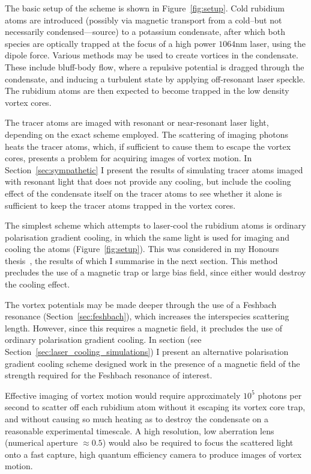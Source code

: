 The basic setup of the scheme is shown in Figure~\ref{fig:setup}. Cold rubidium atoms are introduced (possibly via magnetic transport from a cold--but not necessarily condensed---source) to a potassium condensate, after which both species are optically trapped at the focus of a high power $1064$nm laser, using the dipole force. Various methods may be used to create vortices in the condensate. These include bluff-body flow, where a repulsive potential is dragged through the condensate, and inducing a turbulent state by applying off-resonant laser speckle. The rubidium atoms are then expected to become trapped in the low density vortex cores.

The tracer atoms are imaged with resonant or near-resonant laser light, depending on the exact scheme employed. The scattering of imaging photons heats the tracer atoms, which, if sufficient to cause them to escape the vortex cores, presents a problem for acquiring images of vortex motion. In Section~\ref{sec:sympathetic} I present the results of simulating tracer atoms imaged with resonant light that does not provide any cooling, but include the cooling effect of the condensate itself on the tracer atoms to see whether it alone is sufficient to keep the tracer atoms trapped in the vortex cores.

The simplest scheme which attempts to laser-cool the rubidium atoms is ordinary polarisation gradient cooling, in which the same light is used for imaging and cooling the atoms (Figure~\ref{fig:setup}). This was considered in my Honours thesis~\cite{billington_particle_2010}, the results of which I summarise in the next section. This method precludes the use of a magnetic trap or large bias field, since either would destroy the cooling effect.

The vortex potentials may be made deeper through the use of a Feshbach resonance (Section~\ref{sec:feshbach}), which increases the interspecies scattering length. However, since this requires a magnetic field, it precludes the use of ordinary polarisation gradient cooling. In section (see Section~\ref{sec:laser_cooling_simulations}) I present an alternative polarisation gradient cooling scheme designed work in the presence of a magnetic field of the strength required for the Feshbach resonance of interest.

Effective imaging of vortex motion would require approximately $10^5$ photons per second to scatter off each rubidium atom without it escaping its vortex core trap, and without causing so much heating as to destroy the condensate on a reasonable experimental timescale. A high resolution, low aberration lens (numerical aperture $\approx 0.5$) would also be required to focus the scattered light onto a fast capture, high quantum efficiency camera to produce images of vortex motion.

